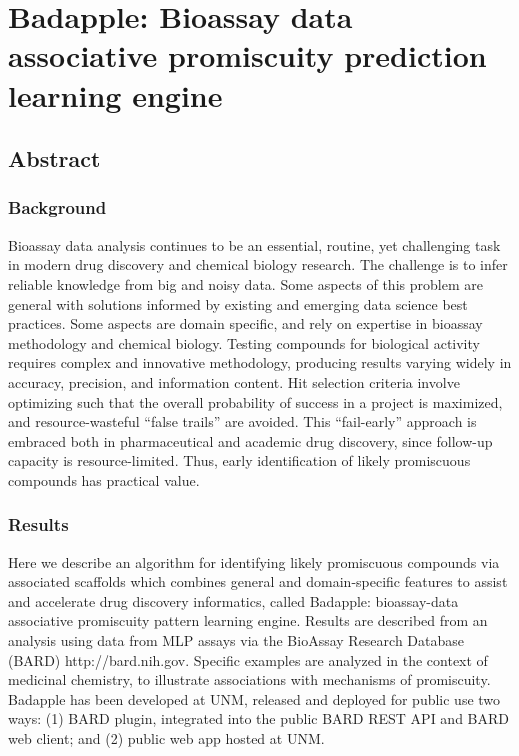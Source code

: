 \chapter{Badapple: Bioassay data associative promiscuity prediction learning engine}

\section{Abstract}

\subsection{Background}

Bioassay data analysis continues to be an essential, routine, yet challenging task in modern drug discovery and chemical biology research. The challenge is to infer reliable knowledge from big and noisy data. Some aspects of this problem are general with solutions informed by existing and emerging data science best practices. Some aspects are domain specific, and rely on expertise in bioassay methodology and chemical biology. Testing compounds for biological activity requires complex and innovative methodology, producing results varying widely in accuracy, precision, and information content. Hit selection criteria involve optimizing such that the overall probability of success in a project is maximized, and resource-wasteful “false trails” are avoided. This “fail-early” approach is embraced both in pharmaceutical and academic drug discovery, since follow-up capacity is resource-limited. Thus, early identification of likely promiscuous compounds has practical value.

\subsection{Results}

Here we describe an algorithm for identifying likely promiscuous compounds via associated scaffolds which combines general and domain-specific features to assist and accelerate drug discovery informatics, called Badapple: bioassay-data associative promiscuity pattern learning engine. Results are described from an analysis using data from MLP assays via the BioAssay Research Database (BARD) http://bard.nih.gov. Specific examples are analyzed in the context of medicinal chemistry, to illustrate associations with mechanisms of promiscuity. Badapple\cite{Yang2016-gn} has been developed at UNM, released and deployed for public use two ways: (1) BARD plugin, integrated into the public BARD REST API and BARD web client; and (2) public web app hosted at UNM.

